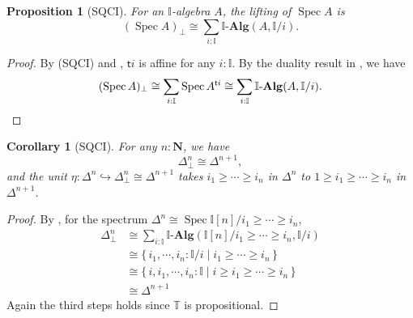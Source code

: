 \documentclass[12pt]{amsart}
\newtheorem{corollary}[theorem]{Corollary}
\newtheorem{proposition}[theorem]{Proposition}
\theoremstyle{definition}
\newtheorem*{axiom}{Axiom}
\newcommand{\mb}[1]{\mathbf{#1}}
\newcommand{\mbb}[1]{\mathbb{#1}}
\newcommand{\T}{\mbb T}
\newcommand{\I}{\mbb I}
\newcommand{\ms}[1]{\mathsf{#1}}
\newcommand{\alg}{\text{-}\mb{Alg}}
\newcommand{\scomp}[2]{\{\,#1\mid#2\,\}}
\newcommand{\hook}{\hookrightarrow}
\newcommand{\N}{\mb N}
\newcommand{\prt}{_{\bot}}
\newcommand{\spec}{\operatorname{Spec}}
\begin{document}
\begin{proposition}[SQCI]\label{prop:liftofaffine}
  For an $\I$-algebra $A$, the lifting of $\spec A$ is
  \[ (\spec A)\prt \cong \sum_{i:\I}\I\alg(A,\I/i). \]
\end{proposition}
\begin{proof}
  By (SQCI) and , $\ms ti$ is affine for any $i:\I$. By the duality result in , we have
  \[ (\spec A)\prt \cong \sum_{i:\I}\spec A^{\ms ti}\cong \sum_{i:\I}\I\alg(A,\I/i). \qedhere \]
\end{proof}





\begin{corollary}[SQCI]
  For any $n : \N$, we have
  \[ \Delta^n\prt \cong \Delta^{n+1}, \]
  and the unit $\eta : \Delta^n \hook \Delta^n\prt \cong \Delta^{n+1}$ takes $i_1 \ge \cdots \ge i_n$ in $\Delta^n$ to $1 \ge i_1 \ge \cdots \ge i_n$ in $\Delta^{n+1}$. 
\end{corollary}
\begin{proof}
  By , for the spectrum $\Delta^n \cong \spec\I[n]/i_1 \ge \cdots \ge i_n$,
  \begin{align*}
    \Delta^n\prt 
    &\cong \sum_{i:\I}\I\alg(\I[n]/i_1\ge\cdots\ge i_n,\I/i) \\
    &\cong \scomp{i_1,\cdots,i_n:\I/i}{i_1 \ge \cdots \ge i_n} \\
    &\cong \scomp{i,i_1,\cdots,i_n:\I}{i \ge i_1 \ge \cdots \ge i_n} \\
    &\cong \Delta^{n+1}
  \end{align*}
  Again the third steps holds since $\T$ is propositional.
\end{proof}
\end{document}
